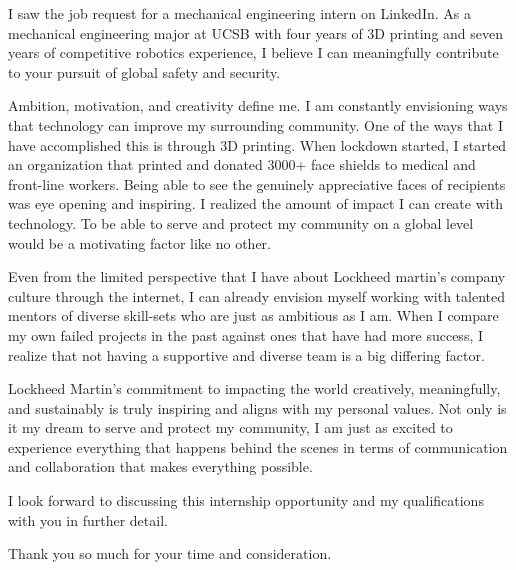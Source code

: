 \documentclass[11pt, letterpaper]{awesome-cv} %
\begin{document}
\makecvheader %

\makelettertitle %


\begin{cvletter}


I saw the job request for a mechanical engineering intern on LinkedIn. As a mechanical engineering major at UCSB with four years of 3D printing and seven years of competitive robotics experience, I believe I can meaningfully contribute to your pursuit of global safety and security.


Ambition, motivation, and creativity define me. I am constantly envisioning ways that technology can improve my surrounding community. One of the ways that I have accomplished this is through 3D printing. When lockdown started, I started an organization that printed and donated 3000+ face shields to medical and front-line workers. Being able to see the genuinely appreciative faces of recipients was eye opening and inspiring. I realized the amount of impact I can create with technology. To be able to serve and protect my community on a global level would be a motivating factor like no other.





Even from the limited perspective that I have about Lockheed martin's company culture through the internet, I can already envision myself working with talented mentors of diverse skill-sets who are just as ambitious as I am. When I compare my own failed projects in the past against ones that have had more success, I realize that not having a supportive and diverse team is a big differing factor. 

Lockheed Martin's commitment to impacting the world creatively, meaningfully, and sustainably is truly inspiring and aligns with my personal values. Not only is it my dream to serve and protect my community, I am just as excited to experience everything that happens behind the scenes in terms of communication and collaboration that makes everything possible.

I look forward to discussing this internship opportunity and my qualifications with you in further detail.

Thank you so much for your time and consideration.


\end{cvletter}


\makeletterclosing %
\end{document}
